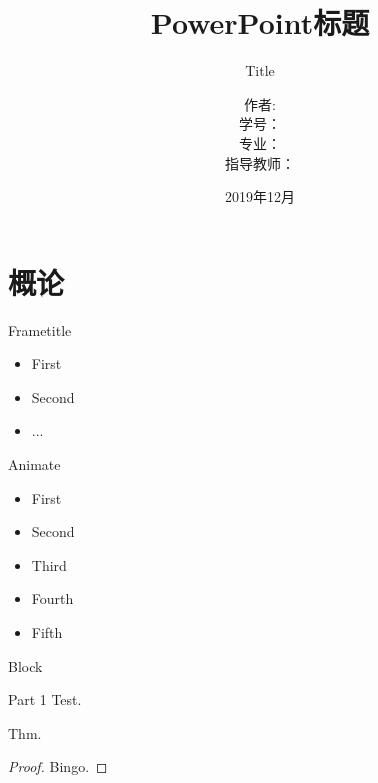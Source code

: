 \documentclass[hyperref,UTF8,11pt]{beamer}
\title[主题]{PowerPoint标题}
\subtitle{Title}
\author[作者]{作者:\quad \\ 学号：\quad  \\ 专业：\quad \\ 指导教师：\quad \\\quad}
\institute[学院]{天津大学 \quad 计算机科学与技术学院}
\date{2019年12月} %
\begin{document}
\newcommand{\redstress}[1]{{\color{red}{#1}}}
\renewcommand{\contentsname}{目录}     %
\renewcommand{\abstractname}{摘要}     %
\renewcommand{\refname}{参考文献}      %
\renewcommand{\indexname}{索引}
\renewcommand{\figurename}{图}
\renewcommand{\tablename}{表}
\renewcommand{\appendixname}{附录}
\begin{frame}
\maketitle
\end{frame}

\section{概论}

\begin{frame}{Frametitle}
    \begin{itemize}
        \item First
        \item Second
        \item ...
    \end{itemize}

\end{frame}

\begin{frame}{Animate}
    \begin{itemize}
        \item First
        \pause
        \item Second
        \pause
        \item<3-3> Third
        \item<4-4> Fourth
        \item<5-5> Fifth
    \end{itemize}

\end{frame}

\begin{frame}{Block}
    \begin{block}{Part 1}
        Test.
    \end{block}
    \begin{theorem}[Thm 1]
        Thm.
    \end{theorem}
    \begin{proof}
        Bingo.
    \end{proof}

\end{frame}
\end{document}
